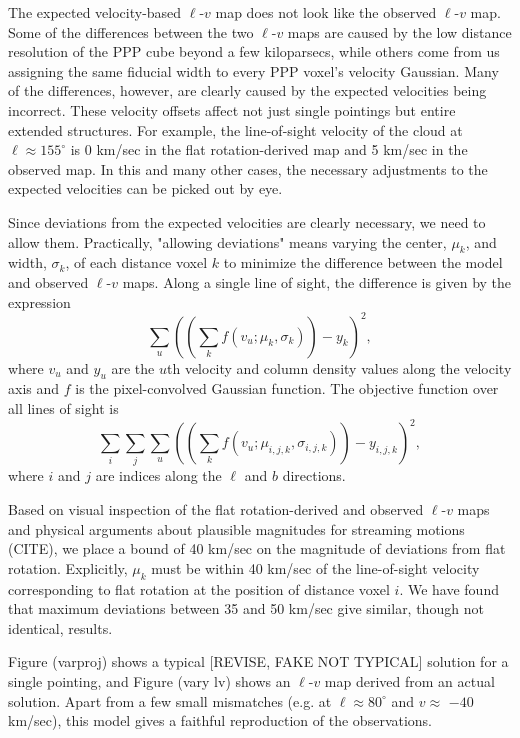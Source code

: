 The expected velocity-based $\ell$-$v$ map does not look like the observed $\ell$-$v$ map. Some of the differences between the two $\ell$-$v$ maps are  caused by the low distance resolution of the PPP cube beyond a few kiloparsecs, while others come from us assigning the same fiducial width to every PPP voxel's velocity Gaussian. Many of the differences, however, are clearly caused by the expected velocities being incorrect. These velocity offsets affect not just single pointings but entire extended structures. For example, the line-of-sight velocity of the cloud at $\ell \approx 155^\circ$ is 0 km/sec in the flat rotation-derived map and 5 km/sec in the observed map. In this and many other cases, the necessary adjustments to the expected velocities can be picked out by eye.

Since deviations from the expected velocities are clearly necessary, we need to allow them. Practically, "allowing deviations" means varying the center, $\mu_k$, and width, $\sigma_k$, of each distance voxel $k$ to minimize the difference between the model and observed $\ell$-$v$ maps. Along a single line of sight, the difference is given by the expression
\begin{equation}
    \sum_u ((\sum_k f(v_u; \mu_k, \sigma_k)) - y_k)^2,
\end{equation}
where $v_u$ and $y_u$ are the $u$th velocity and column density values along the velocity axis and $f$ is the pixel-convolved Gaussian function.
The objective function over all lines of sight is
\begin{equation}
\label{eqn:objective-nosprings}
    \sum_i \sum_j \sum_u ((\sum_k f(v_u; \mu_{i,j,k}, \sigma_{i,j,k})) - y_{i,j,k})^2,
\end{equation}
where $i$ and $j$ are indices along the $\ell$ and $b$ directions. 

Based on visual inspection of the flat rotation-derived and observed $\ell$-$v$ maps and physical arguments about plausible magnitudes for streaming motions (CITE), we place a bound of 40 km/sec on the magnitude of deviations from flat rotation. Explicitly, $\mu_k$ must be within 40 km/sec of the line-of-sight velocity corresponding to flat rotation at the position of distance voxel $i$. We have found that maximum deviations between 35 and 50 km/sec give similar, though not identical, results.

Figure (varproj) shows a typical [REVISE, FAKE NOT TYPICAL] solution for a single pointing, and Figure (vary lv) shows an $\ell$-$v$ map derived from an actual solution. Apart from a few small mismatches (e.g. at $\ell \approx 80^\circ$ and $v\approx$ $-40$ km/sec), this model gives a faithful reproduction of the observations.

